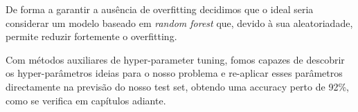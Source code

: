 De forma a garantir a ausência de overfitting decidimos que o ideal seria considerar um modelo baseado em \textit{random forest} que, devido à sua aleatoriadade, permite reduzir fortemente o overfitting.

Com métodos auxiliares de hyper-parameter tuning, fomos capazes de descobrir os hyper-parâmetros ideias para o nosso problema e re-aplicar esses parâmetros directamente na previsão do nosso test set, obtendo uma accuracy perto de 92\%, como se verifica em capítulos adiante. 